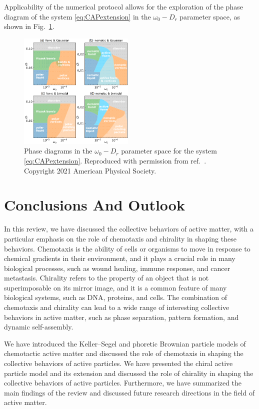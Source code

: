 \documentclass[a4paper, amsfonts, amssymb, amsmath, reprint, showkeys, showpacs, nofootinbib, twoside]{revtex4-2}
\begin{document}
Applicability of the numerical protocol allows for the exploration of the phase diagram of the system \eqref{eq:CAPextension} in the $\omega_0-D_r$ parameter space, as shown in Fig.~\ref{fig:capPhaseDiagram}. 

\begin{figure}
    \includegraphics[width=0.49\textwidth]{./figs/capPhaseDiagram.png}
    \caption{
        \label{fig:capPhaseDiagram} Phase diagrams in the $\omega_0-D_r$ parameter space for the system \eqref{eq:CAPextension}.
        Reproduced with permission from ref.~\cite{PhysRevLett.127.238001}. Copyright 2021 American Physical Society.
    }
\end{figure}

\section{\label{sec:conclusions}Conclusions And Outlook}
In this review, we have discussed the collective behaviors of active matter, with a particular emphasis on the role of chemotaxis and chirality in shaping these behaviors. Chemotaxis is the ability of cells or organisms to move in response to chemical gradients in their environment, and it plays a crucial role in many biological processes, such as wound healing, immune response, and cancer metastasis. Chirality refers to the property of an object that is not superimposable on its mirror image, and it is a common feature of many biological systems, such as DNA, proteins, and cells. The combination of chemotaxis and chirality can lead to a wide range of interesting collective behaviors in active matter, such as phase separation, pattern formation, and dynamic self-assembly.

We have introduced the Keller--Segel and phoretic Brownian particle models of chemotactic active matter and discussed the role of chemotaxis in shaping the collective behaviors of active particles. We have presented the chiral active particle model and its extension and discussed the role of chirality in shaping the collective behaviors of active particles. Furthermore, we have summarized the main findings of the review and discussed future research directions in the field of active matter.
\end{document}
